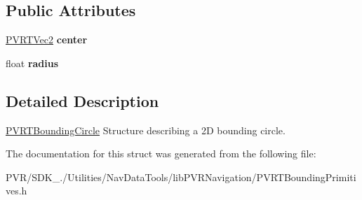 \subsection*{Public Attributes}
\begin{DoxyCompactItemize}
\item 
\hypertarget{structpvrnavigation_1_1_p_v_r_t_bounding_circle_a3564ca89292eb5545d781e7891dc451e}{\hyperlink{struct_p_v_r_t_vec2}{P\+V\+R\+T\+Vec2} {\bfseries center}}\label{structpvrnavigation_1_1_p_v_r_t_bounding_circle_a3564ca89292eb5545d781e7891dc451e}

\item 
\hypertarget{structpvrnavigation_1_1_p_v_r_t_bounding_circle_afcffa6abcbca3794196c37c1797ede39}{float {\bfseries radius}}\label{structpvrnavigation_1_1_p_v_r_t_bounding_circle_afcffa6abcbca3794196c37c1797ede39}

\end{DoxyCompactItemize}


\subsection{Detailed Description}


  \hyperlink{structpvrnavigation_1_1_p_v_r_t_bounding_circle}{P\+V\+R\+T\+Bounding\+Circle}  Structure describing a 2\+D bounding circle. 

The documentation for this struct was generated from the following file\+:\begin{DoxyCompactItemize}
\item 
P\+V\+R/\+S\+D\+K\+\_./\+Utilities/\+Nav\+Data\+Tools/lib\+P\+V\+R\+Navigation/P\+V\+R\+T\+Bounding\+Primitives.\+h\end{DoxyCompactItemize}
